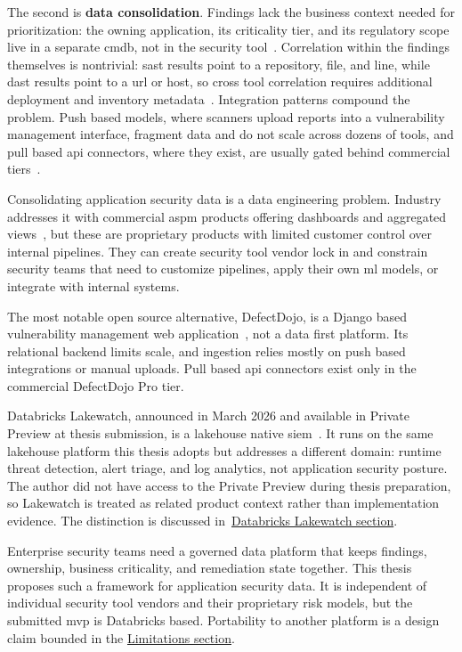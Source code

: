 The second is \textbf{data consolidation}. Findings lack the business context needed for prioritization: the owning application, its criticality tier, and its regulatory scope live in a separate \gls{cmdb}, not in the security tool~\parencite{AXELOS2019, Gartner2021CMDB}. Correlation within the findings themselves is nontrivial: \gls{sast} results point to a repository, file, and line, while \gls{dast} results point to a \gls{url} or host, so cross tool correlation requires additional deployment and inventory metadata~\parencite{Chess2007, Stuttard2011}. Integration patterns compound the problem. Push based models, where scanners upload reports into a vulnerability management interface, fragment data and do not scale across dozens of tools, and pull based \gls{api} connectors, where they exist, are usually gated behind commercial tiers~\parencite{DefectDojo2024, Gartner2023ASPM}.

Consolidating application security data is a data engineering problem. Industry addresses it with commercial \gls{aspm} products offering dashboards and aggregated views~\parencite{Gartner2023ASPM}, but these are proprietary products with limited customer control over internal pipelines. They can create security tool vendor lock in and constrain security teams that need to customize pipelines, apply their own \gls{ml} models, or integrate with internal systems.

The most notable open source alternative, DefectDojo, is a Django based vulnerability management web application~\parencite{DefectDojo2024}, not a data first platform. Its relational backend limits scale, and ingestion relies mostly on push based integrations or manual uploads. Pull based \gls{api} connectors exist only in the commercial DefectDojo Pro tier.

Databricks Lakewatch, announced in March 2026 and available in Private Preview at thesis submission, is a lakehouse native \gls{siem}~\parencite{Databricks2026Lakewatch}. It runs on the same lakehouse platform this thesis adopts but addresses a different domain: runtime threat detection, alert triage, and log analytics, not application security posture. The author did not have access to the Private Preview during thesis preparation, so Lakewatch is treated as related product context rather than implementation evidence. The distinction is discussed in~\hyperref[sec:lakewatch]{Databricks Lakewatch section}.

Enterprise security teams need a governed data platform that keeps findings, ownership, business criticality, and remediation state together. This thesis proposes such a framework for application security data. It is independent of individual security tool vendors and their proprietary risk models, but the submitted \gls{mvp} is Databricks based. Portability to another platform is a design claim bounded in the \hyperref[sec:conclusion-limitations]{Limitations section}.

